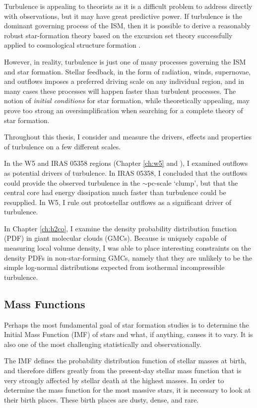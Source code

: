 Turbulence is appealing to theorists as it is a difficult problem to address
directly with observations, but it may have great predictive power.  If turbulence
is the dominant governing process of the ISM, then it is possible to derive a
reasonably robust star-formation theory based on the excursion set theory
successfully applied to cosmological structure formation
\citep{Hopkins2012b,Hennebelle2011a,Hopkins2012d}.  

However, in reality, turbulence is just one of many processes governing the ISM
and star formation.  Stellar feedback, in the form of radiation, winds,
supernovae, and outflows imposes a preferred driving scale on any individual
region, and in many cases these processes will happen faster than turbulent
processes.  The notion of \emph{initial conditions} for star formation,
while theoretically appealing, may prove too strong an oversimplification
when searching for a complete theory of star formation.

Throughout this thesis, I consider and measure the drivers, effects and
properties of turbulence on a few different scales. 

In the W5 and IRAS 05358 regions (Chapter \ref{ch:w5} and
\citet{Ginsburg2009}), I examined outflows as potential drivers of turbulence.
In IRAS 05358, I concluded that the outflows could provide the observed
turbulence in the $\sim$pc-scale `clump', but that the central core had energy
dissipation much faster than turbulence could be resupplied.  In W5, I rule out
protostellar outflows as a significant driver of turbulence.

In Chapter \ref{ch:h2co}, I examine the density probability distribution
function (PDF) in giant molecular clouds (GMCs).  Because \formaldehyde is
uniquely capable of measuring local volume density, I was able to place
interesting constraints on the density PDFs in non-star-forming GMCs, namely
that they are unlikely to be the simple log-normal distributions expected from
isothermal incompressible turbulence.


\subsection{Mass Functions}
\label{sec:massfunctions}
Perhaps the most fundamental goal of star formation studies is to determine the
Initial Mass Function (IMF) of stars and what, if anything, causes it to vary.
It is also one of the most challenging statistically and observationally.

The IMF defines the probability distribution function of stellar masses at
birth, and therefore differs greatly from the present-day stellar mass function
that is very strongly affected by stellar death at the highest masses.  In
order to determine the mass function for the most massive stars, it is
necessary to look at their birth places.  These birth places are dusty, dense,
and rare.  

